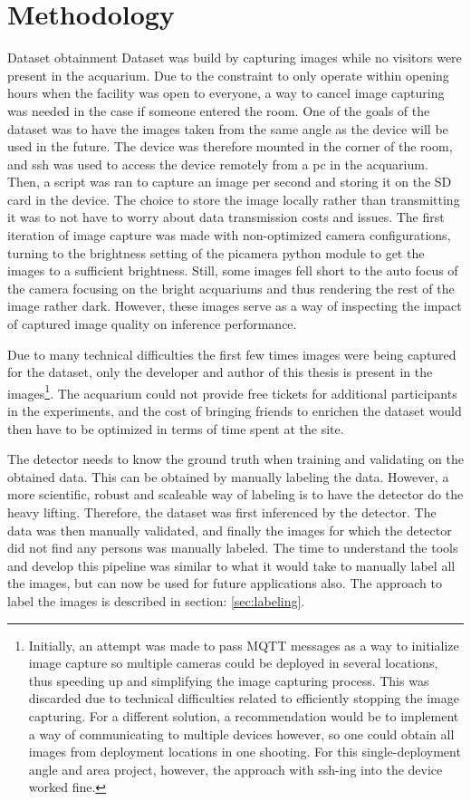 \section{Methodology}


Dataset obtainment
Dataset was build by capturing images while no visitors were present in the acquarium. Due to the constraint to only operate within opening hours when the facility was open to everyone, a way to cancel image capturing was needed in the case if someone entered the room. One of the goals of the dataset was to have the images taken from the same angle as the device will be used in the future. The device was therefore mounted in the corner of the room, and ssh was used to access the device remotely from a pc in the acquarium. Then, a script was ran to capture an image per second and storing it on the SD card in the device. The choice to store the image locally rather than transmitting it was to not have to worry about data transmission costs and issues. The first iteration of image capture was made with non-optimized camera configurations, turning to the brightness setting of the picamera python module to get the images to a sufficient brightness. Still, some images fell short to the auto focus of the camera focusing on the bright acquariums and thus rendering the rest of the image rather dark. However, these images serve as a way of inspecting the impact of captured image quality on inference performance. 

Due to many technical difficulties the first few times images were being captured for the dataset, only the developer and author of this thesis is present in the images\footnote{Initially, an attempt was made to pass MQTT messages as a way to initialize image capture so multiple cameras could be deployed in several locations, thus speeding up and simplifying the image capturing process. This was discarded due to technical difficulties related to efficiently stopping the image capturing. For a different solution, a recommendation would be to implement a way of communicating to multiple devices however, so one could obtain all images from deployment locations in one shooting. For this single-deployment angle and area project, however, the approach with ssh-ing into the device worked fine.}. The acquarium could not provide free tickets for additional participants in the experiments, and the cost of bringing friends to enrichen the dataset would then have to be optimized in terms of time spent at the site.

The detector needs to know the ground truth when training and validating on the obtained data. This can be obtained by manually labeling the data. However, a more scientific, robust and scaleable way of labeling is to have the detector do the heavy lifting. Therefore, the dataset was first inferenced by the detector. The data was then manually validated, and finally the images for which the detector did not find any persons was manually labeled. The time to understand the tools and develop this pipeline was similar to what it would take to manually label all the images, but can now be used for future applications also. The approach to label the images is described in section: \ref{sec:labeling}.    

